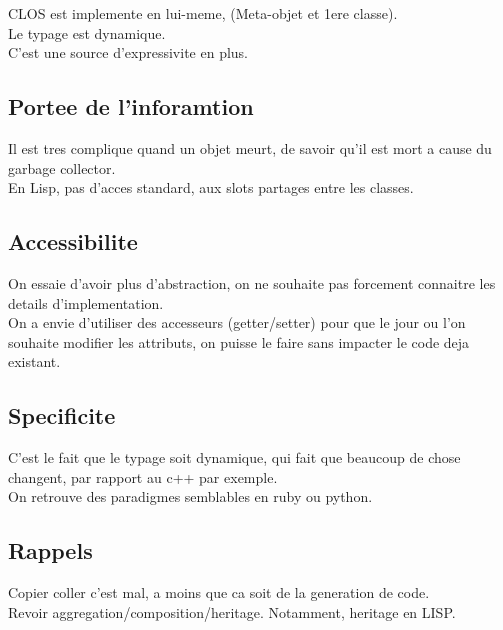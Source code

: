\documentclass[a4paper,11pt]{article}
\begin{document}
CLOS est implemente en lui-meme, (Meta-objet et 1ere classe).\\
Le typage est dynamique.\\
C'est une source d'expressivite en plus.\\

\subsection{Portee de l'inforamtion}
Il est tres complique quand un objet meurt, de savoir qu'il est mort a cause du garbage collector.\\
En Lisp, pas d'acces standard, aux slots partages entre les classes.

\subsection{Accessibilite}
On essaie d'avoir plus d'abstraction, on ne souhaite pas forcement connaitre les details d'implementation.\\
On a envie d'utiliser des accesseurs (getter/setter) pour que le jour ou l'on souhaite modifier les attributs, on puisse le faire sans impacter le code deja existant.\\
\subsection{Specificite}
C'est le fait que le typage soit dynamique, qui fait que beaucoup de chose changent, par rapport au c++ par exemple.\\
On retrouve des paradigmes semblables en ruby ou python.\\

\subsection{Rappels}
Copier coller c'est mal, a moins que ca soit de la generation de code.\\
Revoir aggregation/composition/heritage. Notamment, heritage en LISP.\\
 
\end{document}
